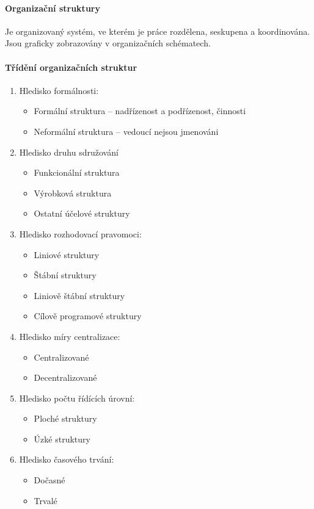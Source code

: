\paragraph*{Organizační struktury}
Je organizovaný systém, ve kterém je práce rozdělena, seskupena a koordinována. Jsou graficky zobrazovány v organizačních schématech.

\paragraph*{Třídění organizačních struktur}
\begin{enumerate}
    \item Hledisko formálnosti:
        \begin{itemize}
            \item Formální struktura -- nadřízenost a podřízenost, činnosti
            \item Neformální struktura -- vedoucí nejsou jmenováni
        \end{itemize}
    \item Hledisko druhu sdružování
        \begin{itemize}
            \item Funkcionální struktura
            \item Výrobková struktura
            \item Ostatní účelové struktury
        \end{itemize}
    \item Hledisko rozhodovací pravomoci:
        \begin{itemize}
            \item Liniové struktury
            \item Štábní struktury
            \item Liniově štábní struktury
            \item Cílově programové struktury
        \end{itemize}
    \item Hledisko míry centralizace:
        \begin{itemize}
            \item Centralizované
            \item Decentralizované
        \end{itemize}
    \item Hledisko počtu řídících úrovní:
        \begin{itemize}
            \item Ploché struktury
            \item Úzké struktury
        \end{itemize}
    \item Hledisko časového trvání:
        \begin{itemize}
            \item Dočasné
            \item Trvalé
        \end{itemize}
\end{enumerate}

